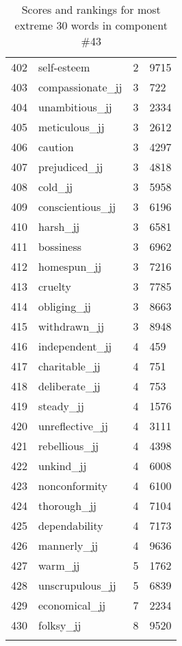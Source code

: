\begin{longtable}[!htbp]{| rlr@{.}l |}
    402 & self-esteem & 2 & 9715 \\
    403 & compassionate\_jj & 3 & 722 \\
    404 & unambitious\_jj & 3 & 2334 \\
    405 & meticulous\_jj & 3 & 2612 \\
    406 & caution & 3 & 4297 \\
    407 & prejudiced\_jj & 3 & 4818 \\
    408 & cold\_jj & 3 & 5958 \\
    409 & conscientious\_jj & 3 & 6196 \\
    410 & harsh\_jj & 3 & 6581 \\
    411 & bossiness & 3 & 6962 \\
    412 & homespun\_jj & 3 & 7216 \\
    413 & cruelty & 3 & 7785 \\
    414 & obliging\_jj & 3 & 8663 \\
    415 & withdrawn\_jj & 3 & 8948 \\
    416 & independent\_jj & 4 & 459 \\
    417 & charitable\_jj & 4 & 751 \\
    418 & deliberate\_jj & 4 & 753 \\
    419 & steady\_jj & 4 & 1576 \\
    420 & unreflective\_jj & 4 & 3111 \\
    421 & rebellious\_jj & 4 & 4398 \\
    422 & unkind\_jj & 4 & 6008 \\
    423 & nonconformity & 4 & 6100 \\
    424 & thorough\_jj & 4 & 7104 \\
    425 & dependability & 4 & 7173 \\
    426 & mannerly\_jj & 4 & 9636 \\
    427 & warm\_jj & 5 & 1762 \\
    428 & unscrupulous\_jj & 5 & 6839 \\
    429 & economical\_jj & 7 & 2234 \\
    430 & folksy\_jj & 8 & 9520 \\
    \hline
    \caption{Scores and rankings for most extreme 30 words in component \#43} \\
\end{longtable}
